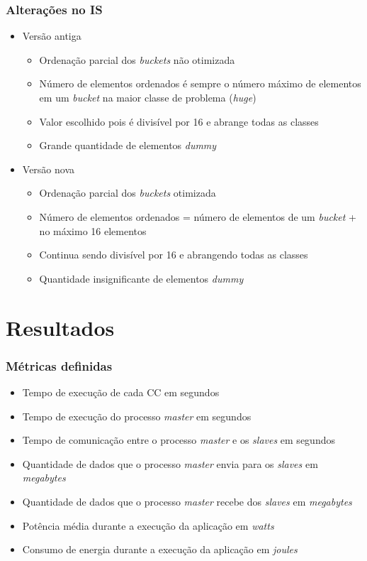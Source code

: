\documentclass[xcolor={table}]{beamer}
\begin{document}
\begin{frame}\frametitle{Alterações no IS}
    \begin{itemize}
        \item {Versão antiga}
        \begin{itemize}
            \item {Ordenação parcial dos \textit{buckets} não otimizada}
            \item {Número de elementos ordenados é sempre o número máximo de elementos em um \textit{bucket} na maior classe de problema (\textit{huge})}
            \item {Valor escolhido pois é divisível por 16 e abrange todas as classes}
            \item {Grande quantidade de elementos \textit{dummy}}
        \end{itemize}
        \item {Versão nova}
        \begin{itemize}
            \item {Ordenação parcial dos \textit{buckets} otimizada}
            \item {Número de elementos ordenados = número de elementos de um \textit{bucket} + no máximo 16 elementos}
            \item {Continua sendo divisível por 16 e abrangendo todas as classes}
            \item {Quantidade insignificante de elementos \textit{dummy}}
        \end{itemize}
    \end{itemize}
\end{frame}

\section{Resultados}
\begin{frame}\frametitle{Métricas definidas}
    \begin{itemize}
        \item {Tempo de execução de cada CC em segundos}
        \item {Tempo de execução do processo \textit{master} em segundos}
        \item {Tempo de comunicação entre o processo \textit{master} e os \textit{slaves} em segundos}
        \item {Quantidade de dados que o processo \textit{master} envia para os \textit{slaves} em \textit{megabytes}}
        \item {Quantidade de dados que o processo \textit{master} recebe dos \textit{slaves} em \textit{megabytes}}
        \item {Potência média durante a execução da aplicação em \textit{watts}}
        \item {Consumo de energia durante a execução da aplicação em \textit{joules}}
    \end{itemize}
\end{frame}
\end{document}

